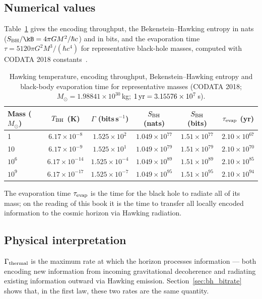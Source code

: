 \subsection{Numerical values}
Table~\ref{tab:bh_throughput} gives the encoding throughput, the Bekenstein--Hawking entropy in nats ($S_{\rm BH}/\kB=4\pi GM^2/\hbar c$) and in bits, and the
evaporation time $\tau=5120\pi G^2M^3/(\hbar c^4)$ for representative black-hole masses, computed with CODATA 2018 constants~\cite{CODATA2018}. \calc
\begin{table}[htbp]\centering\small
\caption{Hawking temperature, encoding throughput, Bekenstein--Hawking entropy and black-body evaporation time for representative masses (CODATA 2018;
$M_\odot=1.98841\times10^{30}$\,kg; $1\,{\rm yr}=3.15576\times10^7$\,s). \calc}\label{tab:bh_throughput}
\begin{tabular}{lccccc}\toprule
Mass ($M_\odot$) & $T_{\rm BH}$ (K) & $\Gamma$ (bits\,s$^{-1}$) & $S_{\rm BH}$ (nats) & $S_{\rm BH}$ (bits) & $\tau_{\rm evap}$ (yr)\\\midrule
1 & $6.17\times10^{-8}$ & $1.525\times10^{2}$ & $1.049\times10^{77}$ & $1.51\times10^{77}$ & $2.10\times10^{67}$\\
10 & $6.17\times10^{-9}$ & $1.525\times10^{1}$ & $1.049\times10^{79}$ & $1.51\times10^{79}$ & $2.10\times10^{70}$\\
$10^{6}$ & $6.17\times10^{-14}$ & $1.525\times10^{-4}$ & $1.049\times10^{89}$ & $1.51\times10^{89}$ & $2.10\times10^{85}$\\
$10^{9}$ & $6.17\times10^{-17}$ & $1.525\times10^{-7}$ & $1.049\times10^{95}$ & $1.51\times10^{95}$ & $2.10\times10^{94}$\\\bottomrule
\end{tabular}
\end{table}
The evaporation time $\tau_{\rm evap}$ is the time for the black hole to radiate all of its mass; on the reading of this book it is the time to transfer all
locally encoded information to the cosmic horizon via Hawking radiation. \interp

\subsection{Physical interpretation}
$\Gamma_{\rm thermal}$ is the maximum rate at which the horizon processes information --- both encoding new information from incoming gravitational
decoherence and radiating existing information outward via Hawking emission. Section~\ref{sec:bh_bitrate} shows that, in the first law, these two rates are the
same quantity. \interp

